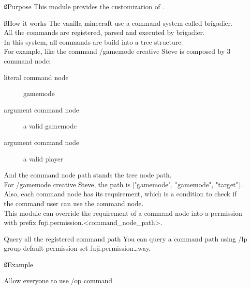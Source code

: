 
\ss{Purpose}
This module provides the customization of .

\ss{How it works}
The vanilla minecraft use a command system called brigadier.\\
All the commands are registered, parsed and executed by brigadier. \\
In this system, all commands are build into a tree structure. \\
For example, like the command /gamemode creative Steve is composed by 3 command node:
\begin{description}
    \item [literal command node] gamemode
    \item [argument command node] a valid gamemode
    \item [argument command node] a valid player
\end{description} And the command node path stands the tree node path. \\
For /gamemode creative Steve, the path is ["gamemode", "gamemode", "target"]. \\
Also, each command node has its requirement, which is a condition to check if the command user can use the command node. \\
This module can override the requirement of a command node into a permission with prefix fuji.permission.<command\_node\_path>.

\begin{tips}{Query all the registered command path}
    You can query a command path using /lp group default permission set fuji.permission\ldots way.
\end{tips}

\ss{Example}
\begin{example}{Allow everyone to use /op command}
\end{example}
